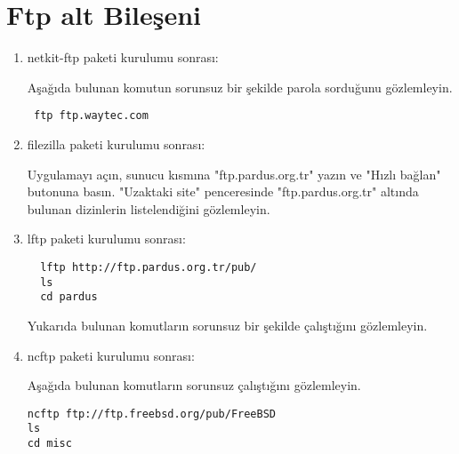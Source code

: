 \documentclass[a4paper,10pt]{article}
\begin{document}
\section{Ftp alt Bileşeni}
\begin{enumerate}
\item netkit-ftp paketi kurulumu sonrası:

Aşağıda bulunan komutun sorunsuz bir şekilde parola sorduğunu gözlemleyin. 
\begin{verbatim}
 ftp ftp.waytec.com
\end{verbatim}

 \item filezilla paketi kurulumu sonrası:

Uygulamayı açın, sunucu kısmına "ftp.pardus.org.tr" yazın ve "Hızlı bağlan" butonuna basın. "Uzaktaki site" penceresinde "ftp.pardus.org.tr" altında bulunan dizinlerin listelendiğini gözlemleyin.

 \item lftp paketi kurulumu sonrası:
\begin{verbatim}
  lftp http://ftp.pardus.org.tr/pub/
  ls 
  cd pardus
\end{verbatim}
Yukarıda bulunan komutların sorunsuz bir şekilde çalıştığını gözlemleyin.
 \item ncftp paketi kurulumu sonrası:

Aşağıda bulunan komutların sorunsuz çalıştığını gözlemleyin.
\begin{verbatim}
ncftp ftp://ftp.freebsd.org/pub/FreeBSD 
ls
cd misc
\end{verbatim}



\end{enumerate}
\end{document}
